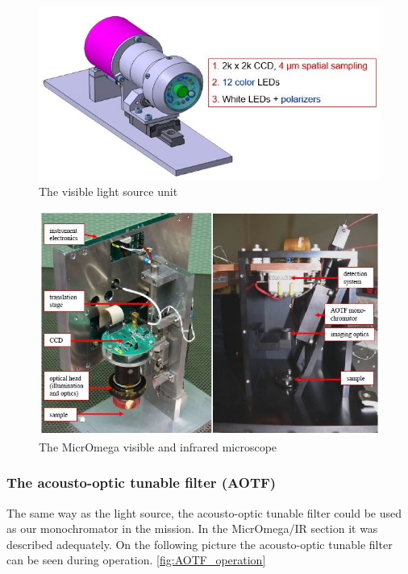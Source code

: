 \begin{figure}[htb]
  \centering
  \includegraphics[scale=0.6]{figures/BFfig/MicrOmegaVIS}
  \caption{The visible light source unit \cite{Bibring_MicrOmega}}
  \label{fig:MicrOmegaVIS}
\end{figure}

\begin{figure}[htb]
  \centering
  \includegraphics[scale=0.6]{figures/BFfig/MicrOmegaVISandIR}
  \caption{The MicrOmega visible and infrared microscope \cite{Mars_Micromega}}
  \label{fig:MicrOmegaVISandIR}
\end{figure}


\subsubsection{The acousto-optic tunable filter (AOTF)}
The same way as the light source, the acousto-optic tunable filter could be used as our monochromator in the mission. In the MicrOmega/IR section it was described adequately. On the following picture the acousto-optic tunable filter can be seen during operation.
\ref{fig:AOTF_operation}


